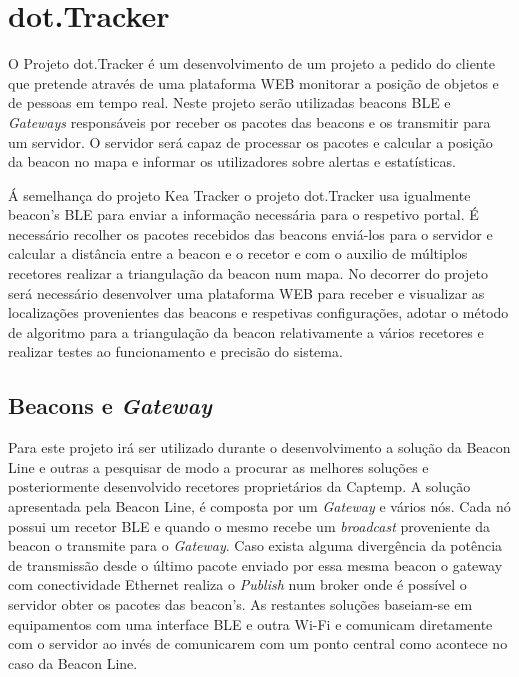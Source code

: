 \section{dot.Tracker} \label{dot.tracker}


\par O Projeto dot.Tracker é um desenvolvimento de um projeto a pedido do cliente que pretende através de uma plataforma WEB monitorar a posição de objetos e de pessoas em tempo real. Neste projeto serão utilizadas beacons BLE e \textit{Gateways} responsáveis por receber os pacotes das beacons e os transmitir para um servidor. O servidor será capaz de processar os pacotes e calcular a posição da beacon no mapa e informar os utilizadores sobre alertas e estatísticas.

Á semelhança do projeto Kea Tracker o projeto dot.Tracker usa igualmente beacon's BLE para enviar a informação necessária para o respetivo portal. É necessário recolher os pacotes recebidos das beacons enviá-los para o servidor e calcular a distância entre a beacon e o recetor e com o auxilio de múltiplos recetores realizar a triangulação da beacon num mapa. No decorrer do projeto será necessário desenvolver uma plataforma WEB para receber e visualizar as localizações provenientes das beacons e respetivas configurações, adotar o método de algoritmo para a triangulação da beacon relativamente a vários recetores e realizar testes ao funcionamento e precisão do sistema.
\subsection{Beacons e \textit{Gateway}}
Para este projeto irá ser utilizado durante o desenvolvimento a solução da Beacon Line\cite{taskit} e outras a pesquisar de modo a procurar as melhores soluções e posteriormente desenvolvido recetores proprietários da Captemp. A solução apresentada pela Beacon Line, é composta por um \textit{Gateway} e vários nós. Cada nó possui um recetor BLE e quando o mesmo recebe um \textit{broadcast} proveniente da beacon o transmite para o \textit{Gateway}. Caso exista alguma divergência da potência de transmissão desde o último pacote enviado por essa mesma beacon o gateway com conectividade Ethernet realiza o \textit{Publish} num broker onde é possível o servidor obter os pacotes das beacon's. As restantes soluções baseiam-se em equipamentos com uma interface BLE e outra Wi-Fi e comunicam diretamente com o servidor ao invés de comunicarem com um ponto central como acontece no caso da Beacon Line.


